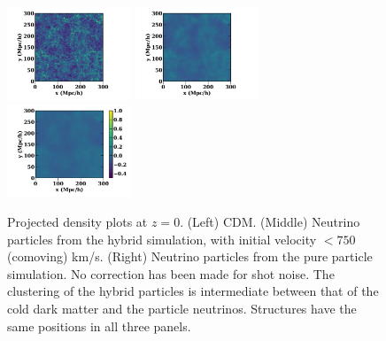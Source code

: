 \documentclass[useAMS, usenatbib]{mnras}
\begin{document}
\begin{figure}
\includegraphics[trim={1.5cm 0 1.5cm 0},clip,width=0.33\textwidth]{nuplots/dens-plt-b300p512nu0_4hybt1.pdf}
\includegraphics[trim={1.5cm 0 1.5cm 0},clip, width=0.33\textwidth]{nuplots/dens-plt-b300p512nu0_4hybt2.pdf}
\includegraphics[trim={1.5cm 0 1.5cm 0},clip, width=0.33\textwidth]{nuplots/dens-plt-b300p512nu0_4pt2.pdf}
  \caption{Projected density plots at $z=0$. (Left) CDM. (Middle) Neutrino particles from the hybrid simulation, with initial velocity $<750$ (comoving) km/s. (Right) Neutrino particles from the pure particle simulation. No correction has been made for shot noise. The clustering of the hybrid particles is intermediate between that of the cold dark matter and the particle neutrinos. Structures have the same positions in all three panels.}
  \label{fig:density_plot}
\end{figure}
\end{document}
